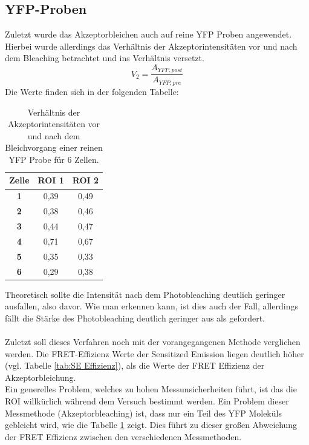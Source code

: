 \subsection{YFP-Proben}
Zuletzt wurde das Akzeptorbleichen auch auf reine YFP Proben angewendet. 
Hierbei wurde allerdings das Verhältnis der Akzeptorintensitäten vor und nach dem Bleaching betrachtet
und ins Verhältnis versetzt. 
\begin{equation}
    V_2 = \frac{A_{YFP,post}}{A_{YFP,pre}}
\end{equation}
Die Werte finden sich in der folgenden Tabelle:
\begin{table}[h]
    \centering
      \begin{tabular}{c|c|c}
      \textbf{Zelle} & \textbf{ROI 1} & \textbf{ROI 2} \\
      \hline
      \textbf{1} & 0,39  & 0,49 \\
      \textbf{2} & 0,38  & 0,46 \\
      \textbf{3} & 0,44  & 0,47 \\
      \textbf{4} & 0,71  & 0,67 \\
      \textbf{5} & 0,35  & 0,33 \\
      \textbf{6} & 0,29  & 0,38 \\
      \end{tabular}
      \caption{Verhältnis der Akzeptorintensitäten vor und nach dem Bleichvorgang einer reinen YFP Probe für 6 Zellen.}
    \label{tab:Verhältnis der Akzeptorintensitäten}%
  \end{table}%
  
Theoretisch sollte die Intensität nach dem Photobleaching deutlich geringer ausfallen, also davor. 
 Wie man erkennen kann, ist dies auch der 
Fall, allerdings fällt die Stärke des Photobleaching deutlich geringer aus als gefordert.\\\\
Zuletzt soll dieses Verfahren noch mit der vorangegangenen Methode verglichen werden. Die FRET-Effizienz Werte
der Sensitized Emission liegen deutlich höher (vgl. Tabelle \ref{tab:SE Effizienz}), als die Werte der FRET Effizienz der Akzeptorbleichung. \\
Ein generelles Problem, welches zu hohen Messunsicherheiten führt, ist das die ROI willkürlich während dem 
Versuch bestimmt werden. Ein Problem dieser Messmethode (Akzeptorbleaching) ist, dass nur ein Teil des YFP 
Moleküls gebleicht wird, wie die Tabelle \ref{tab:Verhältnis der Akzeptorintensitäten} zeigt. Dies 
führt zu dieser großen Abweichung der FRET Effizienz zwischen den verschiedenen Messmethoden.
